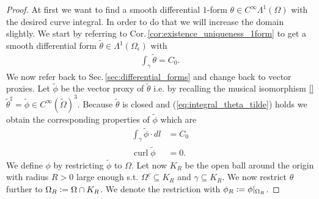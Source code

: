 \documentclass[12pt,a4paper]{article}
\numberwithin{equation}{subsection}
\numberwithin{lemma}{subsection}
\theoremstyle{definition}
\DeclareMathOperator{\curl}{curl}
\begin{document}
\begin{proof}
    At first we want to find a smooth differential $1$-form 
    $\theta \in C^\infty\Lambda^1(\Omega)$ with the desired curve integral. 
    In order to do that we will increase the 
    domain slightly.
    We start by referring to Cor.\,\ref{cor:existence_uniqueness_1form} 
    to get a smooth differential form 
    $\tilde{\theta} \in \Lambda^1(\Omega_\epsilon)$ with 
    \begin{align}
        \int_\gamma \tilde{\theta} = C_0. \label{eq:integral_theta_tilde}
    \end{align}
    We now refer back to Sec.\,\ref{sec:differential_forms} 
    and change back to vector proxies. Let 
    $\tilde{\phi}$ be the vector proxy of $\tilde{\theta}$ 
    i.e. by recalling the musical isomorphism \ref{}
     $\tilde{\theta}^\sharp = \tilde{\phi} \in C^\infty(\tilde{\Omega})^3$.
    Because $\tilde{\theta}$ is closed and (\ref{eq:integral_theta_tilde}) holds
    we obtain the corresponding properties 
    of $\tilde{\phi}$ which are 
    \begin{align*}
        \int_\gamma \tilde{\phi} \cdot dl &= C_0 
        \\ \curl \tilde{\phi} &= 0.
    \end{align*}
    We define $\phi$ by restricting $\tilde{\phi}$ to $\Omega$. 
    Let now $K_R$ be the open ball around the origin with radius $R>0$ large
    enough s.t. $\Omega^c \subseteq K_R$ and $\gamma \subseteq K_R$. 
    We now restrict $\theta$ further to
    $\Omega_R \vcentcolon= \Omega \cap K_R$. We denote the restriction with 
    $\phi_R \vcentcolon= \phi|_{\Omega_R}$. 


\end{proof}
\end{document}
